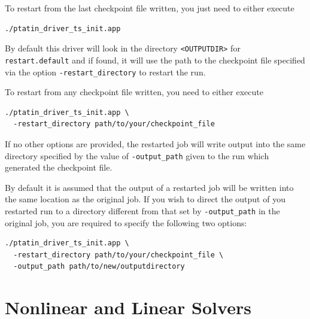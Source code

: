 \documentclass[paper=a4, fontsize=10pt,twoside]{scrartcl}
\begin{document}
To restart from the last checkpoint file written, you just need to either execute
\begin{lstlisting}
./ptatin_driver_ts_init.app
\end{lstlisting}
By default this driver will look in the directory {\tt <OUTPUTDIR>} for {\tt restart.default} and if found, it will use the path to the checkpoint file specified via the option {\tt -restart\_directory} to restart the run.

To restart from any checkpoint file written, you need to either execute
\begin{lstlisting}
./ptatin_driver_ts_init.app \
  -restart_directory path/to/your/checkpoint_file
\end{lstlisting}
If no other options are provided, the restarted job will write output into the same directory specified by the value of {\tt -output\_path} given to the run which generated the checkpoint file.

By default it is assumed that the output of a restarted job will be written into the same location as the original job.
If you wish to direct the output of you restarted run to a directory different from that set by {\tt -output\_path} in the original job, you are required to specify the following two options: \newline
\begin{lstlisting}
./ptatin_driver_ts_init.app \
  -restart_directory path/to/your/checkpoint_file \
  -output_path path/to/new/outputdirectory
\end{lstlisting}

\section{Nonlinear and Linear Solvers}
\end{document}
